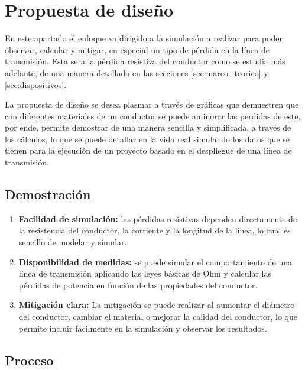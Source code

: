\section{Propuesta de diseño} \label{sec:propuesta}

    En este apartado el enfoque va dirigido a la simulación a realizar para poder observar, calcular y mitigar, en especial un tipo de pérdida en la línea de transmisión. Esta sera la pérdida resistiva del conductor como se estudia más adelante, de una manera detallada en las secciones \ref{sec:marco_teorico} y \ref{sec:dispositivos}. 

    La propuesta de diseño se desea plasmar a través de gráficas que demuestren que con diferentes materiales de un conductor se puede aminorar las perdidas de este, por ende, permite demostrar de una manera sencilla y simplificada, a través de los cálculos, lo que se puede detallar en la vida real simulando los datos que se tienen para la ejecución de un proyecto basado en el despliegue de una línea de transmisión.

    \subsection{Demostración}

        \begin{enumerate}
            \item \textbf{Facilidad de simulación:} las pérdidas resistivas dependen directamente de la resistencia del conductor, la corriente y la longitud de la línea, lo cual es sencillo de modelar y simular.

            \item \textbf{Disponibilidad de medidas:} se puede simular el comportamiento de una línea de transmisión aplicando las leyes básicas de Ohm y calcular las pérdidas de potencia en función de las propiedades del conductor.

            \item \textbf{Mitigación clara:} La mitigación se puede realizar al aumentar el diámetro del conductor, cambiar el material o mejorar la calidad del conductor, lo que permite incluir fácilmente en la simulación y observar los resultados.
        \end{enumerate}

    \subsection{Proceso}

